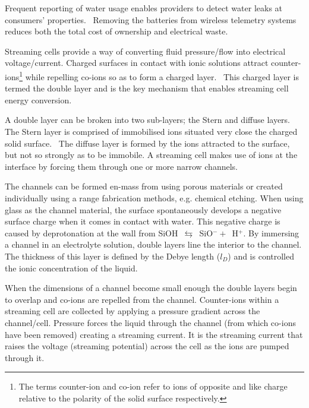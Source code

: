 \documentclass[10pt,final,journal]{IEEEtran}
\begin{document}
    Frequent reporting of water usage enables providers to detect water leaks at consumers' properties.~\cite{Britton2013}
    Removing the batteries from wireless telemetry systems reduces both the total cost of ownership and electrical waste.

    Streaming cells provide a way of converting fluid pressure/flow into electrical voltage/current.
    Charged surfaces in contact with ionic solutions attract counter-ions\footnote{The terms counter-ion and co-ion refer to ions of opposite and like charge relative to the polarity of the solid surface respectively.} while repelling co-ions so as to form a charged layer.~\cite{Stein2004}
    This charged layer is termed the double layer and is the key mechanism that enables streaming cell energy conversion.

    A double layer can be broken into two sub-layers; the Stern and diffuse layers.
    The Stern layer is comprised of immobilised ions situated very close the charged solid surface.~\cite{Salieb-Beugelaar2009}
    The diffuse layer is formed by the ions attracted to the surface, but not so strongly as to be immobile.
    A streaming cell makes use of ions at the interface by forcing them through one or more narrow channels.

    The channels can be formed en-mass from using porous materials or created individually using a range fabrication methods, e.g. chemical etching.
    When using glass as the channel material, the surface spontaneously develops a negative surface charge when it comes in contact with water.
    This negative charge is caused by deprotonation at the wall from SiOH~$\leftrightarrows$~SiO$^{-}+$~H$^{+}$.
    By immersing a channel in an electrolyte solution, double layers line the interior to the channel.
    The thickness of this layer is defined by the Debye length ($l_{D}$) and is controlled the ionic concentration of the liquid.~\cite{Israelachvili2011}

    When the dimensions of a channel become small enough the double layers begin to overlap and co-ions are repelled from the channel.
    Counter-ions within a streaming cell are collected by applying a pressure gradient across the channel/cell.
    Pressure forces the liquid through the channel (from which co-ions have been removed) creating a streaming current.
    It is the streaming current that raises the voltage (streaming potential) across the cell as the ions are pumped through it.
\end{document}

